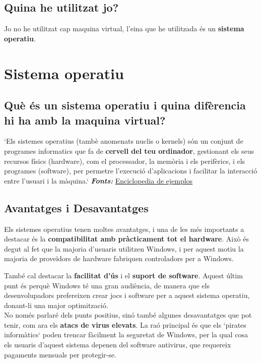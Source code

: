 \subsection{Quina he utilitzat jo?}
Jo no he utilitzat cap maquina virtual, l'eina que he utilitzada és un \textbf{sistema operatiu}.

\section{Sistema operatiu}
\subsection{Què és un sistema operatiu i quina difèrencia hi ha amb la maquina virtual?}
`Els sistemes operatius (tambè anomenats nuclis o kernels) són un conjunt de programes informatics que fa de \textbf{cervell del teu ordinador}, gestionant els seus recursos físics (hardware), com el processador, la memòria i els perifèrics, i els programes (software), per permetre l'execució d'aplicacions i facilitar la interacció entre l'usuari i la màquina.`  \textit{\textbf{Fonts:}} \href{https://www.ejemplos.co/20-ejemplos-de-sistemas-operativos/#:~:text=Un\%20Sistema\%20Operativo\%20(SO)\%20es,\%2C\%20MacOS\%2C\%20Windows\%2C\%20Haiku.}{Enciclopedia de ejemplos}
\subsection{Avantatges i Desavantatges}
Els sistemes operatius tenen moltes avantatges, i una de les més importants a destacar és la \textbf{compatibilitat amb pràcticament tot el hardware}. Això és degut al fet que la majoria d’usuaris utilitzen Windows, i per aquest motiu la majoria de proveïdors de hardware fabriquen controladors per a Windows.

També cal destacar la \textbf{facilitat d’ús} i el \textbf{suport de software}. Aquest últim punt és perquè Windows té una gran audiència, de manera que els desenvolupadors prefereixen crear jocs i software per a aquest sistema operatiu, donant-li una major optimització.\\

No només parlaré dels punts positius, sinó també algunes desavantatges que pot tenir, com ara els \textbf{atacs de virus elevats}. La raó principal és que els `pirates informàtics` poden trencar fàcilment la seguretat de Windows, per la qual cosa els usuaris d’aquest sistema depenen del software antivirus, que requereix pagaments mensuals per protegir-se.

